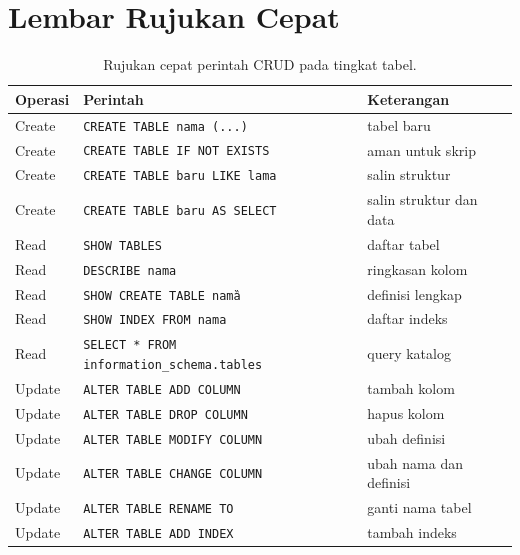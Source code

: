 \documentclass[11pt,a4paper]{article}
\begin{document}
\section{Lembar Rujukan Cepat}

\begin{table}[H]
	\centering
	\caption{Rujukan cepat perintah CRUD pada tingkat tabel.}
	\label{tab:cheat}
	\footnotesize
	\begin{tabularx}{\textwidth}{l l X}
		\toprule
		Operasi & Perintah                                            & Keterangan              \\
		\midrule
		Create  & \texttt{CREATE TABLE nama (...)}                    & tabel baru              \\
		Create  & \texttt{CREATE TABLE IF NOT EXISTS}                 & aman untuk skrip        \\
		Create  & \texttt{CREATE TABLE baru LIKE lama}                & salin struktur          \\
		Create  & \texttt{CREATE TABLE baru AS SELECT}                & salin struktur dan data \\
		Read    & \texttt{SHOW TABLES}                                & daftar tabel            \\
		Read    & \texttt{DESCRIBE nama}                              & ringkasan kolom         \\
		Read    & \texttt{SHOW CREATE TABLE nama\G}                   & definisi lengkap        \\
		Read    & \texttt{SHOW INDEX FROM nama}                       & daftar indeks           \\
		Read    & \texttt{SELECT * FROM information\_schema.tables}   & query katalog           \\
		Update  & \texttt{ALTER TABLE ADD COLUMN}                     & tambah kolom            \\
		Update  & \texttt{ALTER TABLE DROP COLUMN}                    & hapus kolom             \\
		Update  & \texttt{ALTER TABLE MODIFY COLUMN}                  & ubah definisi           \\
		Update  & \texttt{ALTER TABLE CHANGE COLUMN}                  & ubah nama dan definisi  \\
		Update  & \texttt{ALTER TABLE RENAME TO}                      & ganti nama tabel        \\
		Update  & \texttt{ALTER TABLE ADD INDEX}                      & tambah indeks           \\

\end{tabularx}
\end{table}
\end{document}
